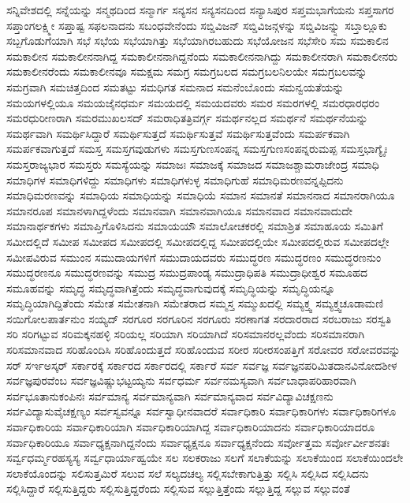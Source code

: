{ಸನ್ನಿವೇಶದಲ್ಲಿ
ಸನ್ನೆಯನ್ನು
ಸನ್ಮಥದಿಂದ
ಸನ್ಮಾರ್ಗ
ಸನ್ಯಸನ
ಸನ್ಯಸನದಿಂದ
ಸನ್ಯಾಸಿಪುರ
ಸಪ್ತಮಭಾಗೆಯನು
ಸಪ್ತಸಾಗರ
ಸಪ್ತಾಂಗಲಕ್ಷ್ಮೀ
ಸಪ್ತಾಷ್ಟ
ಸಫಲನಾದನು
ಸಬಂಧವೇನೆಂದು
ಸಬ್ಡಿವಿಜನ್
ಸಬ್ಡಿವಿಜನ್ಗಳನ್ನು
ಸಬ್ಡಿವಿಜನ್ನ್ನು
ಸಬ್ತಾಲ್ಲೂಕು
ಸಬ್ಬಗೊಡುಗೆಯಾಗಿ
ಸಭೆ
ಸಭೆಯ
ಸಭೆಯಾಗಿತ್ತು
ಸಭೆಯಾಗಿರಬಹುದು
ಸಭೆಯೋಜನ
ಸಭೆಸೇರಿ
ಸಮ
ಸಮಕಾಲಿನ
ಸಮಕಾಲೀನ
ಸಮಕಾಲೀನನಾಗಿದ್ದ
ಸಮಕಾಲೀನನಾಗಿದ್ದನೆಂದು
ಸಮಕಾಲೀನನಾಗಿದ್ದು
ಸಮಕಾಲೀನರಾಗಿ
ಸಮಕಾಲೀನರು
ಸಮಕಾಲೀನರೆಂದು
ಸಮಕಾಲೀನವೂ
ಸಮಕ್ಷಮ
ಸಮಗ್ರ
ಸಮಗ್ರಬಲದ
ಸಮಗ್ರಬಲನಿಲಯೇ
ಸಮಗ್ರಬಲವನ್ನು
ಸಮಗ್ರವಾಗಿ
ಸಮಚಿತ್ತದಿಂದ
ಸಮತಟ್ಟು
ಸಮಧಿಗತ
ಸಮನಾದ
ಸಮನೆಂಬೊಂದು
ಸಮನ್ವಯತೆಯನ್ನು
ಸಮಯಗಳಲ್ಲಿಯೂ
ಸಮಯಜೈನಧರ್ಮ
ಸಮಯದಲ್ಲಿ
ಸಮಯದವರು
ಸಮರ
ಸಮರಗಳಲ್ಲಿ
ಸಮರಧಾರಧರಂ
ಸಮರಧುರೀಣರಾಗಿ
ಸಮರಮುಖಲಸದ್
ಸಮರಾಧಿತತ್ರಿವರ್ಗ್ಗ
ಸಮರ್ಥನಲ್ಲದ
ಸಮರ್ಥನೆ
ಸಮರ್ಥನೆಯನ್ನು
ಸಮರ್ಥವಾಗಿ
ಸಮರ್ಥಿಸಿದ್ದಾರೆ
ಸಮರ್ಥಿಸುತ್ತದೆ
ಸಮರ್ಥಿಸುತ್ತವೆ
ಸಮರ್ಥಿಸುತ್ತವೆಂದು
ಸಮರ್ಪಕವಾಗಿ
ಸಮರ್ಪಕವಾಗುತ್ತದೆ
ಸಮಸ್ತ
ಸಮಸ್ತಗವುಡುಗಳು
ಸಮಸ್ತಗುಣಸಂಪನ್ನ
ಸಮಸ್ತಗುಣಸಂಪನ್ನರುಮಪ್ಪ
ಸಮಸ್ತಭಾಗ್ಯೈಃ
ಸಮಸ್ತರಾಜ್ಯಭಾರ
ಸಮಸ್ತರು
ಸಮಸ್ಯೆಯನ್ನು
ಸಮಾಜಃ
ಸಮಾಜಕ್ಕೆ
ಸಮಾಜದ
ಸಮಾಜಶ್ಚಾಮರಾಜೇಂದ್ರ
ಸಮಾಧಿ
ಸಮಾಧಿಗಳ
ಸಮಾಧಿಗಳಿದ್ದು
ಸಮಾಧಿಗಳು
ಸಮಾಧಿಗಳುಳ್ಳ
ಸಮಾಧಿಗುಹೆ
ಸಮಾಧಿಮರಣವನ್ನಪ್ಪಿದನು
ಸಮಾಧಿಮರಣವನ್ನು
ಸಮಾಧಿಯ
ಸಮಾಧಿಯನ್ನು
ಸಮಾಧಿಯೆ
ಸಮಾನ
ಸಮಾನತೆ
ಸಮಾನನಾದ
ಸಮಾನರಾಗಿಯೂ
ಸಮಾನರೂಪ
ಸಮಾನಳಾಗಿದ್ದಳೆಂದು
ಸಮಾನವಾಗಿ
ಸಮಾನವಾಗಿಯೂ
ಸಮಾನವಾದ
ಸಮಾನವಾದುದೇ
ಸಮಾನಾರ್ಥಕಗಳು
ಸಮಾಪ್ತಿಗೊಳಿಸಿದನು
ಸಮಾಯಯೌ
ಸಮಾಲೋಚಕರಲ್ಲಿ
ಸಮಾಶ್ರಿತ
ಸಮಾಹೂಯ
ಸಮಿತಿಗೆ
ಸಮೀದಲ್ಲಿದೆ
ಸಮೀಪ
ಸಮೀಪದ
ಸಮೀಪದಲ್ಲಿ
ಸಮೀಪದಲ್ಲಿದ್ದ
ಸಮೀಪದಲ್ಲಿಯೇ
ಸಮೀಪದಲ್ಲಿರುವ
ಸಮೀಪದಲ್ಲೇ
ಸಮೀಪವಿರುವ
ಸಮುಂನ
ಸಮುದಾಯಗಳಿಗೆ
ಸಮುದಾಯದವರು
ಸಮುದ್ಧರಣ
ಸಮುದ್ಧರಣಂ
ಸಮುದ್ಧರಣನುಂ
ಸಮುದ್ಧರಣನೂ
ಸಮುದ್ಧರಣವನ್ನು
ಸಮುದ್ರ
ಸಮುದ್ರಪಾಂಡ್ಯ
ಸಮುದ್ರಾಧಿಪತಿ
ಸಮುದ್ರಾಧೀಶ್ವರ
ಸಮೂಹದ
ಸಮೂಹವನ್ನು
ಸಮೃದ್ಧ
ಸಮೃದ್ಧವಾಗಿತ್ತೆಂದು
ಸಮೃದ್ಧವಾಗುವುದಕ್ಕೆ
ಸಮೃದ್ಧಿಯನ್ನು
ಸಮೃದ್ಧಿಯನ್ನೂ
ಸಮೃದ್ಧಿಯಾಗಿದ್ದಿತೆಂದು
ಸಮೇತ
ಸಮೇತನಾಗಿ
ಸಮೇತರಾದ
ಸಮ್ಮಸ್ತ
ಸಮ್ಮುಖದಲ್ಲಿ
ಸಮ್ಯಕ್ತ್ವ
ಸಮ್ಯಕ್ತ್ವಚೂಡಾಮಣಿ
ಸಯಿಗೋಲಪಾರ್ತನುಂ
ಸಯ್ಯದ್
ಸರಗೂರ
ಸರಗೂರಿನ
ಸರಗೂರು
ಸರಣಾಗತ
ಸರದಾರರಾದ
ಸರಬರಾಜು
ಸರಸ್ವತಿ
ಸರಿ
ಸರಿಗಟ್ಟುವ
ಸರಿಮಕ್ಕನಹಳ್ಳಿ
ಸರಿಯಲ್ಲ
ಸರಿಯಾಗಿ
ಸರಿಯಾಗಿದೆ
ಸರಿಸಮಾನರಲ್ಲವೆಂದು
ಸರಿಸಮಾನರಾಗಿ
ಸರಿಸಮಾನವಾದ
ಸರಿಹೊಂದಿಸಿ
ಸರಿಹೊಂದುತ್ತದೆ
ಸರಿಹೊಂದುವ
ಸರೀರ
ಸರೀರಸಂಪತ್ತಿಗೆ
ಸರೋವರ
ಸರೋವರವನ್ನು
ಸರ್
ಸರ್ಇಅಸ್ಕರ್
ಸರ್ಕಾರಕ್ಕೆ
ಸರ್ಕಾರದ
ಸರ್ಕಾರದಲ್ಲಿ
ಸರ್ಕಾರೆ
ಸರ್ವ
ಸರ್ವಜ್ಞ
ಸರ್ವಜ್ಞನಪರಿಮಿತದಾನವಿನೋದಶೀಳ
ಸರ್ವಜ್ಞಪುರವೆಂಬ
ಸರ್ವಜ್ಞವಿಷ್ಣುಭಟ್ಟಯ್ಯನು
ಸರ್ವಧರ್ಮ
ಸರ್ವನಮಸ್ಯವಾಗಿ
ಸರ್ವಬಾಧಾಪರಿಹಾರವಾಗಿ
ಸರ್ವಭೂತಾನುಕಂಪಿನಃ
ಸರ್ವಮಾನ್ಯ
ಸರ್ವಮಾನ್ಯವಾಗಿ
ಸರ್ವಮಾನ್ಯವಾದ
ಸರ್ವವಿದ್ಯಾವಿಚಕ್ಷಣನು
ಸರ್ವವಿದ್ಯಾಸುವೈಚಕ್ಷಣ್ಯಂ
ಸರ್ವಸ್ವವನ್ನೂ
ಸರ್ವಸ್ವಾಧೀನವಾದರೆ
ಸರ್ವಾಧಿಕಾರಿ
ಸರ್ವಾಧಿಕಾರಿಗಳು
ಸರ್ವಾಧಿಕಾರಿಗಳೂ
ಸರ್ವಾಧಿಕಾರಿಯ
ಸರ್ವಾಧಿಕಾರಿಯಾಗಿ
ಸರ್ವಾಧಿಕಾರಿಯಾಗಿದ್ದ
ಸರ್ವಾಧಿಕಾರಿಯಾದನು
ಸರ್ವಾಧಿಕಾರಿಯಾದರೂ
ಸರ್ವಾಧಿಕಾರಿಯೂ
ಸರ್ವಾಧ್ಯಕ್ಷನಾಗಿದ್ದನೆಂದು
ಸರ್ವಾಧ್ಯಕ್ಷನೂ
ಸರ್ವಾಧ್ಯಕ್ಷನೆಂದು
ಸರ್ವೋತ್ತಮ
ಸರ್ವೋರ್ವೀಶನತಃ
ಸರ್ವ್ವಧರ್ಮ್ಮರಹಸ್ಯಸ್ಯ
ಸರ್ವ್ವಧಾರ್ಯಾಹ್ವಯೇ
ಸಲ
ಸಲಕರಾಜು
ಸಲಗೆ
ಸಲಾಕೆಯನ್ನು
ಸಲಾಕೆಯಿಂದ
ಸಲಾಕೆಯಿಂದಲೇ
ಸಲಾಕೆಯೊಂದನ್ನು
ಸಲಿಸುತ್ತಮಿರೆ
ಸಲುವ
ಸಲೆ
ಸಲ್ಯದಚಲ್ಯ
ಸಲ್ಲಿಸಬೇಕಾಗುತ್ತಿತ್ತು
ಸಲ್ಲಿಸಿ
ಸಲ್ಲಿಸಿದ
ಸಲ್ಲಿಸಿದನು
ಸಲ್ಲಿಸಿದ್ದಾರೆ
ಸಲ್ಲಿಸುತ್ತಿದ್ದರು
ಸಲ್ಲಿಸುತ್ತಿದ್ದರೆಂದು
ಸಲ್ಲಿಸುವ
ಸಲ್ಲುತ್ತಿತ್ತೆಂದು
ಸಲ್ಲುತ್ತಿದ್ದ
ಸಲ್ಲುವ
ಸಲ್ಲುವಂತೆ
}
